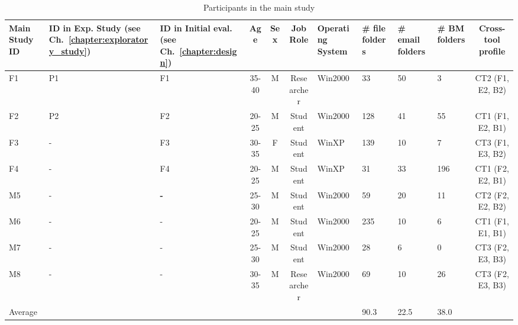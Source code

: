 \begin{table}
\begin{center}
\begin{footnotesize}
\setlength{\extrarowheight}{2pt}
\begin{tabular}{|p{1.6cm}|p{1.7cm}|p{1.7cm}|c|c|c|p{1.4cm}|p{1cm}|p{1cm}|p{1cm}|c|}
\hline
{\bf Main Study  ID} & {\bf ID in Exp. Study (see Ch.~\ref{chapter:exploratory_study})} & {\bf ID in Initial eval. (see Ch.~\ref{chapter:design})} &  {\bf Age} &  {\bf Sex} & {\bf Job Role} & {\bf Operating System} & {\bf \# file folders} & {\bf \# email folders } & {\bf \# BM folders } & {\bf Cross-tool profile} \\
\hline
        F1 &         P1 &         F1 &      35-40 &          M & Researcher &    Win2000 &         33 &         50 &          3 & CT2 (F1, E2, B2) \\
\hline
        F2 &         P2 &         F2 &      20-25 &          M &    Student &    Win2000 &        128 &         41 &         55 & CT1 (F1, E2, B1) \\
\hline
        F3 &          - &         F3 &      30-35 &          F &    Student &      WinXP &        139 &         10 &          7 & CT3 (F1, E3, B2) \\
\hline
        F4 &          - &         F4 &      20-25 &          M &    Student &      WinXP &         31 &         33 &        196 & CT1 (F2, E2, B1) \\
\hline
        M5 &          - &    {\bf -} &      25-30 &          M &    Student &    Win2000 &         59 &         20 &         11 & CT2 (F2, E2, B2) \\
\hline
        M6 &          - &          - &      20-25 &          M &    Student &    Win2000 &        235 &         10 &          6 & CT1 (F1, E1, B1) \\
\hline
        M7 &          - &          - &      25-30 &          M &    Student &    Win2000 &         28 &          6 &          0 & CT3 (F2, E3, B3) \\
\hline
        M8 &          - &          - &      30-35 &          M & Researcher &    Win2000 &         69 &         10 &         26 & CT3 (F2, E3, B3) \\
\hline
   Average &            &            &            &            &            &            &       90.3 &       22.5 &       38.0 &            \\
\hline
\end{tabular}  
\end{footnotesize}
\caption{Participants in the main study}
\label{table:main-study:participants}
\end{center}
\end{table}
\normalsize



